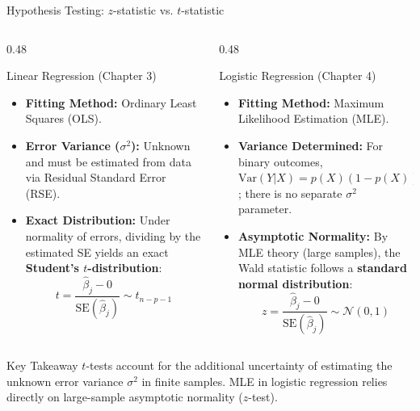 \documentclass[aspectratio=169, 11pt]{beamer}
\begin{document}
\begin{frame}{Hypothesis Testing: $z$-statistic vs. $t$-statistic}
\begin{columns}[T]
    \begin{column}{0.48\textwidth}
        \begin{block}{Linear Regression (Chapter 3)}
            \begin{itemize}
                \item \textbf{Fitting Method:} Ordinary Least Squares (OLS).
                \item \textbf{Error Variance ($\sigma^2$):} Unknown and must be estimated from data via Residual Standard Error (RSE).
                \item \textbf{Exact Distribution:} Under normality of errors, dividing by the estimated SE yields an exact \textbf{Student's $t$-distribution}:
                $$t = \frac{\hat{\beta}_j - 0}{\text{SE}(\hat{\beta}_j)} \sim t_{n-p-1}$$
            \end{itemize}
        \end{block}
    \end{column}

    \begin{column}{0.48\textwidth}
        \begin{block}{Logistic Regression (Chapter 4)}
            \begin{itemize}
                \item \textbf{Fitting Method:} Maximum Likelihood Estimation (MLE).
                \item \textbf{Variance Determined:} For binary outcomes, $\text{Var}(Y|X) = p(X)(1 - p(X))$; there is no separate $\sigma^2$ parameter.
                \item \textbf{Asymptotic Normality:} By MLE theory (large samples), the Wald statistic follows a \textbf{standard normal distribution}:
                $$z = \frac{\hat{\beta}_j - 0}{\text{SE}(\hat{\beta}_j)} \sim \mathcal{N}(0, 1)$$
            \end{itemize}
        \end{block}
    \end{column}
\end{columns}

\vspace{0.25cm}
\begin{alertblock}{Key Takeaway}
$t$-tests account for the additional uncertainty of estimating the unknown error variance $\sigma^2$ in finite samples. MLE in logistic regression relies directly on large-sample asymptotic normality ($z$-test).
\end{alertblock}
\end{frame}
\end{document}
